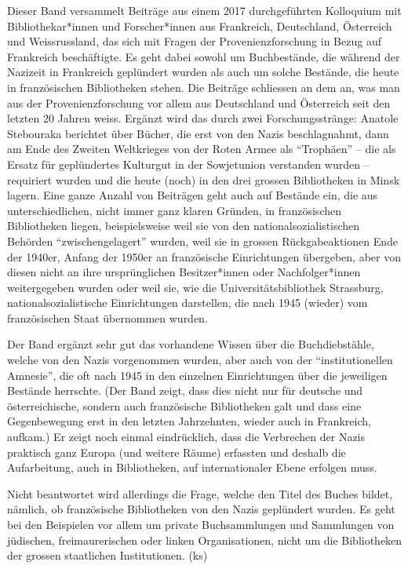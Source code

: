 \documentclass[a4paper,
fontsize=11pt,
oneside,
numbers=noperiodatend,
parskip=half-,
bibliography=totoc,
final
]{scrartcl}
\begin{document}
Dieser Band versammelt Beiträge aus einem 2017 durchgeführten Kolloquium
mit Bibliothekar*innen und Forscher*innen aus Frankreich, Deutschland,
Österreich und Weissrussland, das sich mit Fragen der
Provenienzforschung in Bezug auf Frankreich beschäftigte. Es geht dabei
sowohl um Buchbestände, die während der Nazizeit in Frankreich
geplündert wurden als auch um solche Bestände, die heute in
französischen Bibliotheken stehen. Die Beiträge schliessen an dem an,
was man aus der Provenienzforschung vor allem aus Deutschland und
Österreich seit den letzten 20 Jahren weiss. Ergänzt wird das durch zwei
Forschungsstränge: Anatole Stebouraka berichtet über Bücher, die erst
von den Nazis beschlagnahmt, dann am Ende des Zweiten Weltkrieges von
der Roten Armee als \enquote{Trophäen} -- die als Ersatz für
geplündertes Kulturgut in der Sowjetunion verstanden wurden --
requiriert wurden und die heute (noch) in den drei grossen Bibliotheken
in Minsk lagern. Eine ganze Anzahl von Beiträgen geht auch auf Bestände
ein, die aus unterschiedlichen, nicht immer ganz klaren Gründen, in
französischen Bibliotheken liegen, beispielsweise weil sie von den
nationalsozialistischen Behörden \enquote{zwischengelagert} wurden, weil
sie in grossen Rückgabeaktionen Ende der 1940er, Anfang der 1950er an
französische Einrichtungen übergeben, aber von diesen nicht an ihre
ursprünglichen Besitzer*innen oder Nachfolger*innen weitergegeben wurden
oder weil sie, wie die Universitätsbibliothek Strassburg,
nationalsozialistische Einrichtungen darstellen, die nach 1945 (wieder)
vom französischen Staat übernommen wurden.

Der Band ergänzt sehr gut das vorhandene Wissen über die Buchdiebstähle,
welche von den Nazis vorgenommen wurden, aber auch von der
\enquote{institutionellen Amnesie}, die oft nach 1945 in den einzelnen
Einrichtungen über die jeweiligen Bestände herrschte. (Der Band zeigt,
dass dies nicht nur für deutsche und österreichische, sondern auch
französische Bibliotheken galt und dass eine Gegenbewegung erst in den
letzten Jahrzehnten, wieder auch in Frankreich, aufkam.) Er zeigt noch
einmal eindrücklich, dass die Verbrechen der Nazis praktisch ganz Europa
(und weitere Räume) erfassten und deshalb die Aufarbeitung, auch in
Bibliotheken, auf internationaler Ebene erfolgen muss.

Nicht beantwortet wird allerdings die Frage, welche den Titel des Buches
bildet, nämlich, ob französische Bibliotheken von den Nazis geplündert
wurden. Es geht bei den Beispielen vor allem um private Buchsammlungen
und Sammlungen von jüdischen, freimaurerischen oder linken
Organisationen, nicht um die Bibliotheken der grossen staatlichen
Institutionen. (ks)
\end{document}

